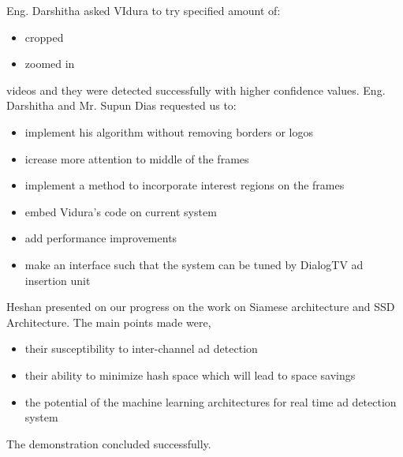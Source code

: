 Eng. Darshitha asked VIdura to try specified amount of:
\begin{itemize}
\item cropped
\item zoomed in
\end{itemize}

videos and they were detected successfully with higher confidence values. Eng. Darshitha and Mr. Supun Dias requested us to:

\begin{itemize}
\item implement his algorithm without removing borders or logos
\item icrease more attention to middle of the frames
\item implement a method to incorporate interest regions on the frames
\item embed Vidura's code on current system
\item add performance improvements
\item make an interface such that the system can be tuned by DialogTV ad insertion unit
\end{itemize}

Heshan presented on our progress on the work on Siamese architecture and SSD Architecture. The main points made were,
\begin{itemize}
\item their susceptibility to inter-channel ad detection
\item their ability to minimize hash space which will lead to space savings
\item the potential of the machine learning architectures for real time ad detection system
\end{itemize}

The demonstration concluded successfully.
